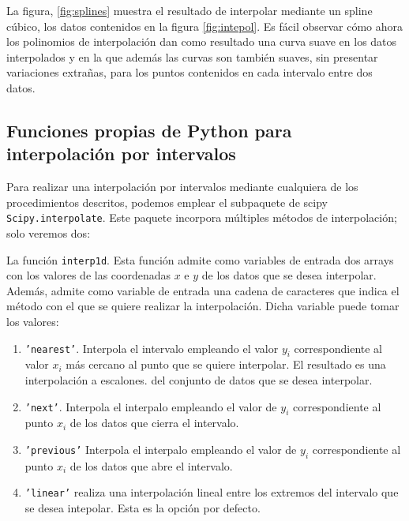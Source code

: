 \begin{paracol}{2}
 La figura, \ref{fig:splines} muestra el resultado de interpolar mediante un spline cúbico, los datos contenidos en la figura \ref{fig:intepol}. Es fácil observar cómo ahora los polinomios de interpolación dan como resultado una curva suave en los datos interpolados y en la que además las curvas son también suaves, sin presentar variaciones extrañas, para los puntos contenidos en cada intervalo entre dos datos.
 
\subsection{Funciones propias de Py\-thon para interpolación por intervalos} 

Para realizar una interpolación por intervalos mediante cualquiera de los procedimientos descritos, podemos emplear el subpaquete de scipy \texttt{Scipy.interpolate}. Este paquete incorpora múltiples métodos de interpolación; solo veremos dos: 

La función \texttt{interp1d}. Esta función admite como variables de entrada dos arrays con los valores de las coordenadas $x$ e $y$ de los datos que se desea interpolar. Además, admite como variable  de entrada una cadena de caracteres que indica el método con el que se quiere realizar la interpolación. Dicha variable puede tomar los valores:
\begin{enumerate}
\item \texttt{'nearest'}. Interpola el intervalo empleando el valor $y_i$ correspondiente al valor  $x_i$ más cercano al punto que se quiere interpolar. El resultado es una interpolación a escalones.
 del conjunto de datos que se desea interpolar.
\item \texttt{'next'}. Interpola el interpalo empleando el valor de $y_i$ correspondiente al punto $x_i$ de los datos que cierra el intervalo.
\item \texttt{'previous'} Interpola el interpalo empleando el valor de $y_i$ correspondiente al punto $x_i$ de los datos que abre el intervalo.
\item \texttt{'linear'} realiza una interpolación lineal entre los extremos del intervalo que se desea intepolar. Esta es la opción por defecto.
\end{enumerate} 


\end{paracol}
